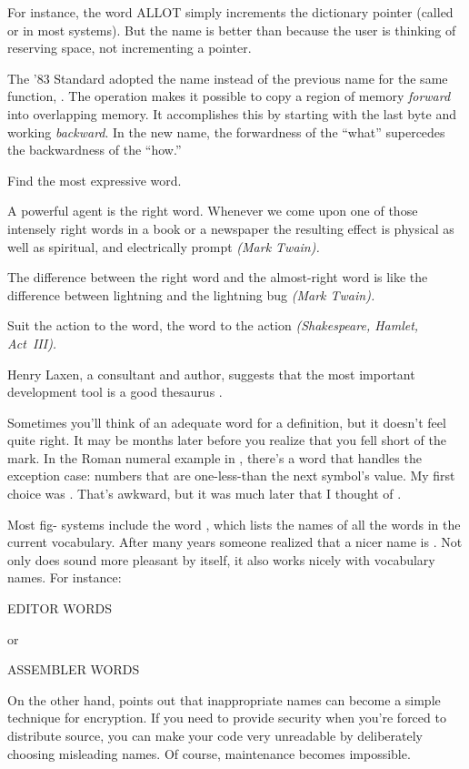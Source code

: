 For instance, the \Forth{} word ALLOT simply increments the dictionary
pointer (called  or  in most systems).  But the
name  is better than  because the user is
thinking of reserving space, not incrementing a pointer.

The '83 Standard adopted the name  instead of the
previous name for the same function, .  The operation
makes it possible to copy a region of memory \emph{forward} into
overlapping memory.  It accomplishes this by starting with the last
byte and working \emph{backward}.  In the new name, the forwardness of
the ``what'' supercedes the backwardness of the ``how.''

\begin{tip}
Find the most expressive word.
\end{tip}
\begin{tfquot}
A powerful agent is the right word.  Whenever we come upon one of those intensely
right words in a book or a newspaper the resulting effect is physical
as well as spiritual, and electrically prompt \emph{(Mark Twain).}

The difference between the right word and the almost-right word is like the
difference between lightning and the lightning bug \emph{(Mark Twain).}

Suit the action to the word, the word to the action \emph{(Shakespeare, Hamlet,
Act~III).}
\end{tfquot}
Henry Laxen, a \Forth{} consultant and author, suggests that the most
important \Forth{} development tool is a good thesaurus \cite{laxen}.

Sometimes you'll think of an adequate word for a definition, but it
doesn't feel quite right.  It may be months later before you realize
that you fell short of the mark.  In the Roman numeral example in
, there's a word that handles the exception case: numbers that
are one-less-than the next symbol's value.  My first choice was
.  That's awkward, but it was much later that I thought of
.

Most fig-\Forth{} systems include the word , which lists
the names of all the words in the current vocabulary.  After many
years someone realized that a nicer name is .  Not only
does  sound more pleasant by itself, it also works nicely
with vocabulary names.  For instance:
\begin{Code}
EDITOR WORDS
\end{Code}
or
\begin{Code}
ASSEMBLER WORDS
\end{Code}
On the other hand,  points out
that inappropriate names can become a simple technique for encryption.
If you need to provide security when you're forced to distribute
source, you can make your code very unreadable by deliberately
choosing misleading names.  Of course, maintenance becomes impossible.

